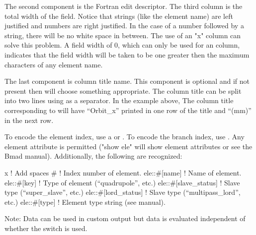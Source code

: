 {{{{{{{{\begin{description}
The second component is the Fortran edit descriptor. The third column is the total width of the
field. Notice that strings (like the element name) are left justified and numbers are right
justified. In the case of a number followed by a string, there will be no white space in
between. The use of an "x" column can solve this problem. A field width of 0, which can only be used
for an  column, indicates that the field width will be taken to be one greater
then the maximum characters of any element name.

The last component is column title name. This component is optional and if not present then \tao
will choose something appropriate. The column title can be split into two lines using  as a
separator.  In the example above, The column title corresponding to  will have
``Orbit_x'' printed in one row of the title and ``(mm)'' in the next row.

To encode the element index, use a \vn{\#} or . To encode the branch index, use
. Any element attribute is permitted ("show ele" will show element attributes or see
the Bmad manual). Additionally, the following are recognized:
\begin{example}
  x                           ! Add spaces
  #                           ! Index number of element.
  ele::#[name]                ! Name of element.
  ele::#[key]                 ! Type of element (``quadrupole'', etc.)
  ele::#[slave_status]        ! Slave type (``super_slave'', etc.)
  ele::#[lord_status]         ! Slave type (``multipass_lord'', etc.)
  ele::#[type]                ! Element type string (see \bmad manual).
\end{example}

Note: Data can be used in custom output but data is evaluated independent of whether the
 switch is used.


\end{description}}}}}}}}}
